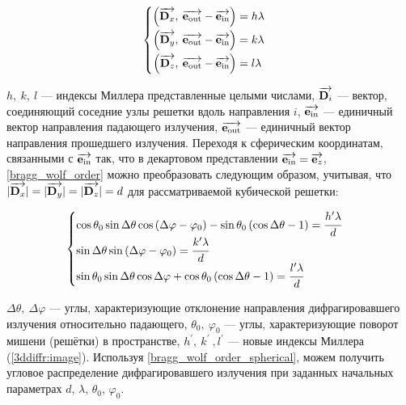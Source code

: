     \begin{equation}
        \begin{cases}
        \begin{aligned}
            \left( \overrightarrow{\textbf{D}_{x}},\: \overrightarrow{\textbf{e}_{\textrm{out}}} - \overrightarrow{\textbf{e}_{\textrm{in}}}\right) &= h \lambda
            \\
            \left( \overrightarrow{\textbf{D}_{y}},\: \overrightarrow{\textbf{e}_{\textrm{out}}} - \overrightarrow{\textbf{e}_{\textrm{in}}}\right) &= k \lambda
            \\
            \left( \overrightarrow{\textbf{D}_{z}},\: \overrightarrow{\textbf{e}_{\textrm{out}}} - \overrightarrow{\textbf{e}_{\textrm{in}}}\right) &= l \lambda
        \end{aligned}
        \end{cases}
        \label{bragg_wolf_order}
    \end{equation}

 $h,\:k,\:l$ --- индексы Миллера представленные целыми числами, $\overrightarrow{\textbf{D}_{i}}$ --- вектор, соединяющий соседние узлы решетки вдоль направления $i$, $\overrightarrow{\textbf{e}_{\textrm{in}}}$ --- единичный вектор направления падающего излучения, $\overrightarrow{\textbf{e}_{\textrm{out}}}$ --- единичный вектор направления прошедшего излучения. Переходя к сферическим координатам, связанными с $\overrightarrow{\textbf{e}_{\textrm{in}}}$ так, что в декартовом представлении $\overrightarrow{\textbf{e}_{\textrm{in}}} = \overrightarrow{\textbf{e}_{z}}$, \autoref{bragg_wolf_order} можно преобразовать следующим образом, учитывая, что $|\overrightarrow{\textbf{D}_{x}}| = |\overrightarrow{\textbf{D}_{y}}| = |\overrightarrow{\textbf{D}_{z}}| = d$ для рассматриваемой кубической решетки:

    \begin{equation}
        \begin{cases}
            \cos{\theta_0}\sin{\Delta \theta}\cos{\left( \Delta \varphi - \varphi_0 \right)} - \sin{\theta_0} \left( \cos{\Delta \theta} - 1 \right) = \cfrac{h^{\prime} \lambda}{d}
            \\
            \sin{\Delta \theta} \sin{\left( \Delta \varphi - \varphi_0 \right)} = \cfrac{k^{\prime} \lambda}{d}
            \\
            \sin{\theta_0}\sin{\Delta \theta}\cos{\Delta \varphi} + \cos{\theta_0} \left( \cos{\Delta \theta} - 1 \right)= \cfrac{l^{\prime} \lambda}{d}
        \end{cases}
        \label{bragg_wolf_order_spherical}
    \end{equation}

 $\Delta \theta,\:\Delta \varphi$ --- углы, характеризующие отклонение направления дифрагировавшего излучения относительно падающего, $\theta_0,\:\varphi_0$ --- углы, характеризующие поворот мишени (решётки) в пространстве, $h^\prime,\:k^\prime\:,l^\prime$ --- новые индексы Миллера (\autoref{3ddiffr:image}). Используя \autoref{bragg_wolf_order_spherical}, можем получить угловое распределение дифрагировавшего излучения при заданных начальных параметрах $d$, $\lambda$, $\theta_0$, $\varphi_0$. 

